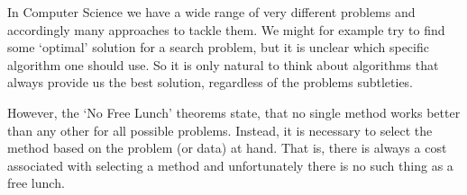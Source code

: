 
In Computer Science we have a wide range of very different problems and accordingly many approaches to tackle them.
We might for example try to find some `optimal' solution for a search problem, but it is unclear which specific algorithm one should use.
So it is only natural to think about algorithms that always provide us the best solution, regardless of the problems subtleties.

However, the `No Free Lunch' theorems state, that no single method works better than any other for all possible problems.
Instead, it is necessary to select the method based on the problem (or data) at hand.
That is, there is always a cost associated with selecting a method and unfortunately there is no such thing as a free lunch.

